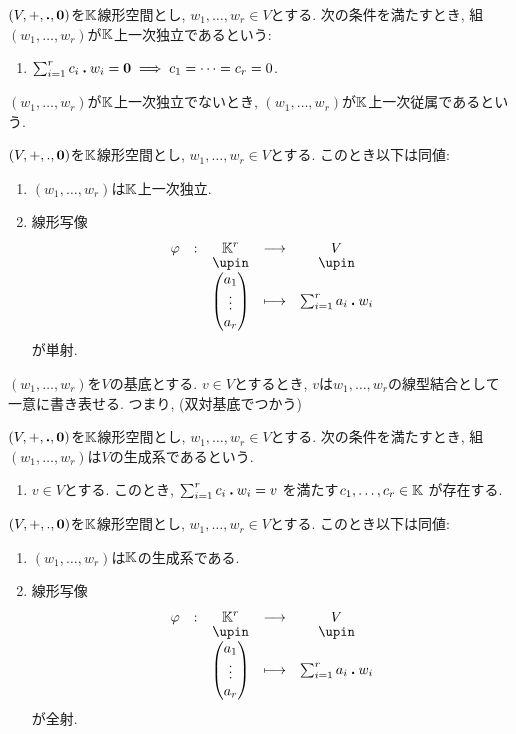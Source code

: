 \begin{definition}
  $(V,+,\mathbin{\boldsymbol{.}},\boldsymbol{0})$を$\mathbb{K}$線形空間とし,
  $w_1,\ldots,w_r\in V$とする.
  次の条件を満たすとき,
  組$(w_1,\ldots,w_r)$が$\mathbb{K}$上一次独立であるという:
  \begin{enumerate}
  \item $\sum_{i=1}^{r} c_i\mathbin{\boldsymbol{.}} w_i=\boldsymbol{0} \implies c_1=\cdots=c_r=0$.
  \end{enumerate}
  $(w_1,\ldots,w_r)$が$\mathbb{K}$上一次独立でないとき,
  $(w_1,\ldots,w_r)$が$\mathbb{K}$上一次従属であるという.
\end{definition}
\begin{prop}
  $(V,+,.,\boldsymbol{0})$を$\mathbb{K}$線形空間とし,
  $w_1,\ldots,w_r\in V$とする.
  このとき以下は同値:
  \begin{enumerate}
  \item $(w_1,\ldots,w_r)$は$\mathbb{K}$上一次独立.
  \item 線形写像
    \begin{align*}
      \shazo{\varphi}{\KK^r}{V}
      {\begin{pmatrix}a_1\\\vdots\\a_r\end{pmatrix}}{\sum_{i=1}^{r}a_i\act w_i}
    \end{align*}
    が単射.
  \end{enumerate}
\end{prop}

\begin{prop}
  $(w_1,\ldots,w_r)$を$V$の基底とする.
  $v\in V$とするとき,
  $v$は$w_1,\ldots,w_r$の線型結合として一意に書き表せる.
  つまり,
 (双対基底でつかう)  
\end{prop}

\begin{definition}
  $(V,+,\mathbin{\boldsymbol{.}},\boldsymbol{0})$を$\mathbb{K}$線形空間とし,
  $w_1,\ldots,w_r\in V$とする.
  次の条件を満たすとき,
  組$(w_1,\ldots,w_r)$は$V$の生成系であるという.
  \begin{enumerate}
  \item
    $v\in V$とする.
    このとき,
    $\sum_{i=1}^{r} c_i\mathbin{\boldsymbol{.}} w_i=v$
    を満たす$c_1,\ldots,c_r\in\mathbb{K}$ が存在する.
  \end{enumerate}
\end{definition}
\begin{prop}
  $(V,+,.,\boldsymbol{0})$を$\mathbb{K}$線形空間とし,
  $w_1,\ldots,w_r\in V$とする.
  このとき以下は同値:
  \begin{enumerate}
  \item $(w_1,\ldots,w_r)$は$\mathbb{K}$の生成系である.
  \item 線形写像
    \begin{align*}
      \shazo{\varphi}{\KK^r}{V}
      {\begin{pmatrix}a_1\\\vdots\\a_r\end{pmatrix}}{\sum_{i=1}^{r}a_i\act w_i}
    \end{align*}
    が全射.
  \end{enumerate}
\end{prop}

